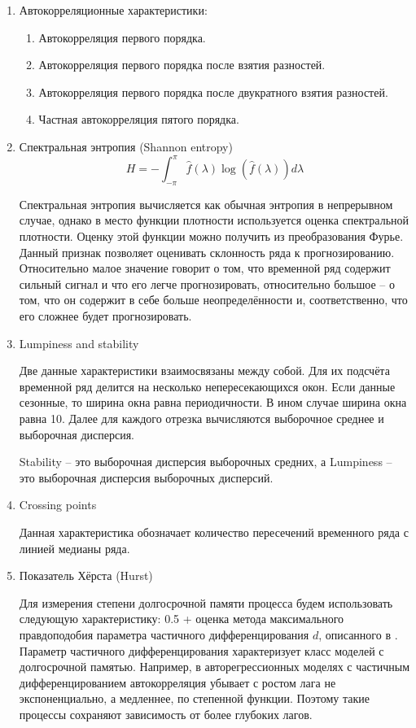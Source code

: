 \documentclass[a4paper,12pt]{article}
\begin{document}
\begin{enumerate}
	\item Автокорреляционные характеристики:
		\begin{enumerate}
			\item Автокорреляция первого порядка. 
			\item Автокорреляция первого порядка после взятия разностей.
			\item Автокорреляция первого порядка после двукратного взятия разностей.
			\item Частная автокорреляция пятого порядка.
		\end{enumerate}
	
	\item Спектральная энтропия (Shannon entropy)
	\[ H = - \int_{-\pi}^{\pi}\hat{f}(\lambda) \log(\hat{f}(\lambda)) d\lambda \]
	
	Спектральная энтропия вычисляется как обычная энтропия в непрерывном случае, однако в место функции плотности используется оценка спектральной плотности. Оценку этой функции можно получить из преобразования Фурье. Данный признак позволяет оценивать склонность ряда к прогнозированию. Относительно малое значение говорит о том, что временной ряд содержит сильный сигнал и что его легче прогнозировать, относительно большое -- о том, что он содержит в себе больше неопределённости и, соответственно, что его сложнее будет прогнозировать. 
	
	\item Lumpiness and stability
	
	
	Две данные характеристики взаимосвязаны между собой. Для их подсчёта временной ряд делится на несколько непересекающихся окон. Если данные сезонные, то ширина окна равна периодичности. В ином случае ширина окна равна 10. Далее для каждого отрезка вычисляются выборочное среднее и выборочная дисперсия. 
	
	Stability -- это выборочная дисперсия выборочных средних, а Lumpiness -- это выборочная дисперсия выборочных дисперсий. \cite{anomalous}
	
	\item Crossing points
	
	Данная характеристика обозначает количество пересечений временного ряда с линией медианы ряда.
	
	\item Показатель Хёрста (Hurst)
	
	Для измерения степени долгосрочной памяти процесса будем использовать следующую характеристику: 0.5 + оценка метода максимального правдоподобия параметра частичного дифференцирования $ d $, описанного в \cite{frac}. Параметр частичного дифференцирования характеризует класс моделей с долгосрочной памятью. Например, в авторегрессионных моделях с частичным дифференцированием автокорреляция убывает с ростом лага не экспоненциально, а медленнее, по степенной функции. Поэтому такие процессы сохраняют зависимость от более глубоких лагов.  \cite[стр.~19]{meta}
	

\end{enumerate}
\end{document}
